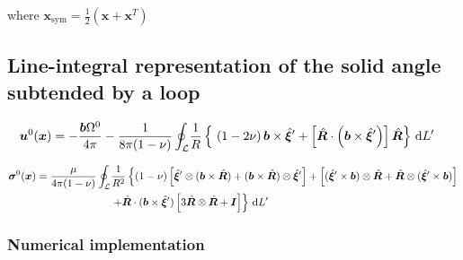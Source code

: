 where $\bm x_{\text{sym}}=\frac{1}{2}(\bm x+\bm x^T)$

\subsection{Line-integral representation of the solid angle subtended by a loop}

\begin{align}
 \bm u^0(\bm x)=-\frac{\bm b\Omega^0}{4\pi}-\frac{1}{8\pi(1-\nu)}\oint_\mathcal{L}&\frac{1}{R}\left\{\ 
 \left(1-2\nu\right) \bm b\times\hat{\bm \xi}'
+ \left[\hat{\bm R}\cdot\left(\bm b\times\hat{\bm \xi}' \right) \right]\hat{\bm R}  \right\}\dL'
\end{align}


\begin{align}
\bm\sigma^0(\bm x)=\frac{\mu}{4\pi(1-\nu)}\oint_{\mathcal{L}}&\frac{1}{R^2}\left\{
(1-\nu)\left[\hat{\bm\xi}'\otimes(\bm b\times\hat{\bm R})+(\bm b\times\hat{\bm R})\otimes\hat{\bm\xi}'\right] 
+\left[(\hat{\bm \xi}'\times\bm b)\otimes\hat{\bm R}+\hat{\bm R}\otimes(\hat{\bm \xi}'\times\bm b)\right] \right. \nonumber\\
&\left.+\hat{\bm R}\cdot(\bm b\times\hat{\bm\xi}')\left[3\hat{\bm R}\otimes\hat{\bm R}+\bm I \right]
\right\}\, \text{d}L'
\end{align}


\subsubsection{Numerical implementation}

